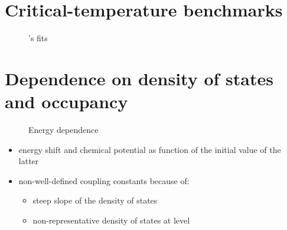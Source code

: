 \section{Critical-temperature benchmarks}

\begin{figure}
    \small
    
    
    
    
    \caption{'s fits}
\end{figure}

\section{Dependence on density of states and occupancy}

\begin{figure}
    \small
    \centering
    
    
    
    \caption{Energy dependence}
\end{figure}

\begin{itemize}
    \item energy shift and chemical potential as function of the initial value
          of the latter
    \item non-well-defined coupling constants because of:
    \begin{itemize}
        \item steep slope of the density of states
        \item non-representative density of states at  level
    \end{itemize}
\end{itemize}
